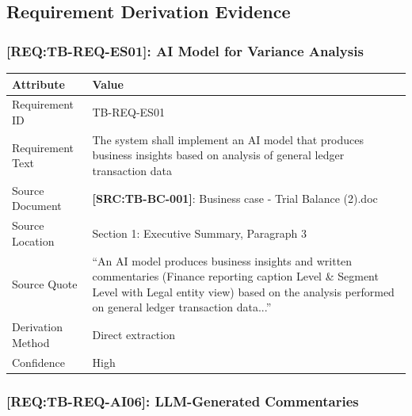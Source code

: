 \documentclass[11pt,a4paper]{article}
\newcommand{\srcref}[1]{\textcolor{sourcegreen}{\textbf{[SRC:#1]}}}
\newcommand{\reqref}[1]{\textcolor{reqpurple}{\textbf{[REQ:#1]}}}
\begin{document}
\subsection{Requirement Derivation Evidence}

\subsubsection{\reqref{TB-REQ-ES01}: AI Model for Variance Analysis}

\begin{table}[h]
\centering
\begin{tabular}{@{}L{3.5cm}L{10.5cm}@{}}
\toprule
\textbf{Attribute} & \textbf{Value} \\
\midrule
Requirement ID & TB-REQ-ES01 \\
Requirement Text & The system shall implement an AI model that produces business insights based on analysis of general ledger transaction data \\
Source Document & \srcref{TB-BC-001}: Business case - Trial Balance (2).doc \\
Source Location & Section 1: Executive Summary, Paragraph 3 \\
Source Quote & ``An AI model produces business insights and written commentaries (Finance reporting caption Level \& Segment Level with Legal entity view) based on the analysis performed on general ledger transaction data...'' \\
Derivation Method & Direct extraction \\
Confidence & High \\
\bottomrule
\end{tabular}
\end{table}

\subsubsection{\reqref{TB-REQ-AI06}: LLM-Generated Commentaries}
\end{document}
